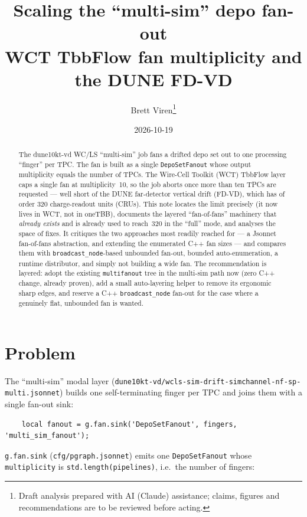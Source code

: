 \documentclass[11pt]{article}
\title{Scaling the ``multi-sim'' depo fan-out\\
  \large WCT TbbFlow fan multiplicity and the DUNE FD-VD}
\author{Brett Viren\thanks{Draft analysis prepared with AI (Claude) assistance;
  claims, figures and recommendations are to be reviewed before acting.}}
\date{2026-10-19}
\newcommand{\code}[1]{\texttt{#1}}
\newcommand{\file}[1]{\texttt{\small #1}}
\begin{document}
\maketitle

\begin{abstract}
The dune10kt-vd WC/LS ``multi-sim'' job fans a drifted depo set out to one
processing ``finger'' per TPC.  The fan is built as a single \code{DepoSetFanout}
whose output multiplicity equals the number of TPCs.  The Wire-Cell Toolkit
(WCT) TbbFlow layer caps a single fan at multiplicity~10, so the job aborts once
more than ten TPCs are requested --- well short of the DUNE far-detector vertical
drift (FD-VD), which has of order 320 charge-readout units (CRUs).  This note
locates the limit precisely (it now lives in WCT, not in oneTBB), documents the
layered ``fan-of-fans'' machinery that \emph{already exists} and is already used
to reach~320 in the ``full'' mode, and analyses the space of fixes.  It critiques
the two approaches most readily reached for --- a Jsonnet fan-of-fans abstraction,
and extending the enumerated C++ fan sizes --- and compares them with
\code{broadcast\_node}-based unbounded fan-out, bounded auto-enumeration, a
runtime distributor, and simply not building a wide fan.  The recommendation is
layered: adopt the existing \code{multifanout} tree in the multi-sim path now
(zero C++ change, already proven), add a small auto-layering helper to remove its
ergonomic sharp edges, and reserve a C++ \code{broadcast\_node} fan-out for the
case where a genuinely flat, unbounded fan is wanted.
\end{abstract}

\tableofcontents

\section{Problem}

The ``multi-sim'' modal layer
(\file{dune10kt-vd/wcls-sim-drift-simchannel-nf-sp-multi.jsonnet}) builds one
self-terminating finger per TPC and joins them with a single fan-out sink:

\begin{verbatim}
    local fanout = g.fan.sink('DepoSetFanout', fingers, 'multi_sim_fanout');
\end{verbatim}

\noindent
\code{g.fan.sink} (\file{cfg/pgraph.jsonnet}) emits one \code{DepoSetFanout}
whose \code{multiplicity} is \code{std.length(pipelines)}, i.e.\ the number of
fingers:
\end{document}
